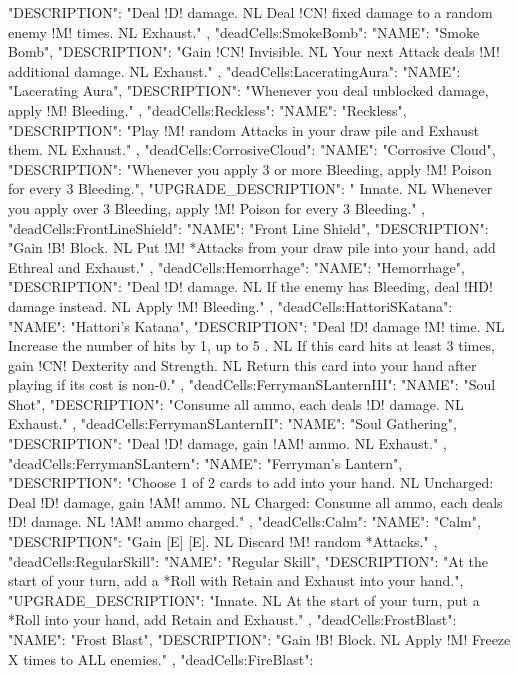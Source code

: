 {{    "DESCRIPTION": "Deal !D! damage. NL Deal !CN! fixed damage to a random enemy !M! times. NL Exhaust."
  },
  "deadCells:SmokeBomb": {
    "NAME": "Smoke Bomb",
    "DESCRIPTION": "Gain !CN! Invisible. NL Your next Attack deals !M! additional damage. NL Exhaust."
  },
  "deadCells:LaceratingAura": {
    "NAME": "Lacerating Aura",
    "DESCRIPTION": "Whenever you deal unblocked damage, apply !M! Bleeding."
  },
  "deadCells:Reckless": {
    "NAME": "Reckless",
    "DESCRIPTION": "Play !M! random Attacks in your draw pile and Exhaust them. NL Exhaust."
  },
  "deadCells:CorrosiveCloud": {
    "NAME": "Corrosive Cloud",
    "DESCRIPTION": "Whenever you apply 3 or more Bleeding, apply !M! Poison for every 3 Bleeding.",
    "UPGRADE_DESCRIPTION": " Innate. NL Whenever you apply over 3 Bleeding, apply !M! Poison for every 3 Bleeding."
  },
  "deadCells:FrontLineShield": {
    "NAME": "Front Line Shield",
    "DESCRIPTION": "Gain !B! Block. NL Put !M! *Attacks from your draw pile into your hand, add Ethreal and Exhaust."
  },
  "deadCells:Hemorrhage": {
    "NAME": "Hemorrhage",
    "DESCRIPTION": "Deal !D! damage. NL If the enemy has Bleeding, deal !HD! damage instead. NL Apply !M! Bleeding."
  },
  "deadCells:HattoriSKatana": {
    "NAME": "Hattori's Katana",
    "DESCRIPTION": "Deal !D! damage !M! time. NL Increase the number of hits by 1, up to 5 . NL If this card hits at least 3 times, gain !CN! Dexterity and Strength. NL Return this card into your hand after playing if its cost is non-0."
  },
  "deadCells:FerrymanSLanternIII": {
    "NAME": "Soul Shot",
    "DESCRIPTION": "Consume all ammo, each deals !D! damage. NL Exhaust."
  },
  "deadCells:FerrymanSLanternII": {
    "NAME": "Soul Gathering",
    "DESCRIPTION": "Deal !D! damage, gain !AM! ammo. NL Exhaust."
  },
  "deadCells:FerrymanSLantern": {
    "NAME": "Ferryman's Lantern",
    "DESCRIPTION": "Choose 1 of 2 cards to add into your hand. NL Uncharged: Deal !D! damage, gain !AM! ammo. NL Charged: Consume all ammo, each deals !D! damage. NL !AM! ammo charged."
  },
  "deadCells:Calm": {
    "NAME": "Calm",
    "DESCRIPTION": "Gain [E] [E]. NL Discard !M! random *Attacks."
  },
  "deadCells:RegularSkill": {
    "NAME": "Regular Skill",
    "DESCRIPTION": "At the start of your turn, add a *Roll with Retain and Exhaust into your hand.",
    "UPGRADE_DESCRIPTION": "Innate. NL At the start of your turn, put a *Roll into your hand, add Retain and Exhaust."
  },
  "deadCells:FrostBlast": {
    "NAME": "Frost Blast",
    "DESCRIPTION": "Gain !B! Block. NL Apply !M! Freeze X times to ALL enemies."
  },
  "deadCells:FireBlast": {
}}
